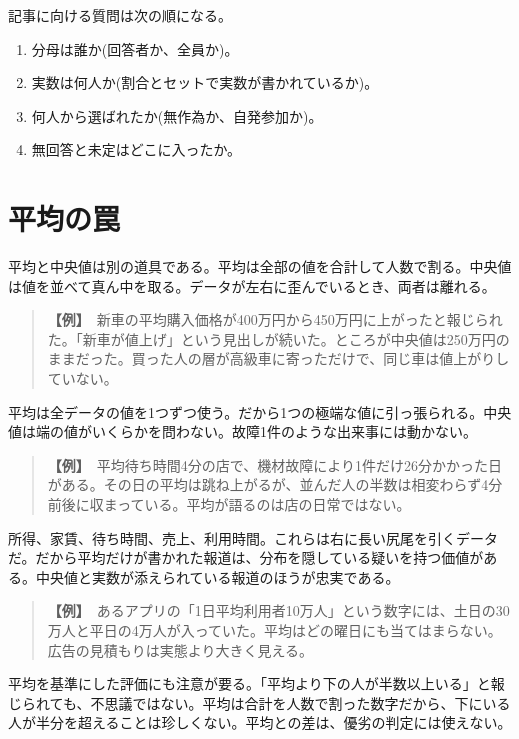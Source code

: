 \documentclass{article}
\begin{document}
記事に向ける質問は次の順になる。

\begin{enumerate}
\item 分母は誰か(回答者か、全員か)。
\item 実数は何人か(割合とセットで実数が書かれているか)。
\item 何人から選ばれたか(無作為か、自発参加か)。
\item 無回答と未定はどこに入ったか。
\end{enumerate}

\section{平均の罠}

平均と中央値は別の道具である。平均は全部の値を合計して人数で割る。中央値は値を並べて真ん中を取る。データが左右に歪んでいるとき、両者は離れる。

\begin{quote}
\textbf{【例】}\ 新車の平均購入価格が400万円から450万円に上がったと報じられた。「新車が値上げ」という見出しが続いた。ところが中央値は250万円のままだった。買った人の層が高級車に寄っただけで、同じ車は値上がりしていない。
\end{quote}

平均は全データの値を1つずつ使う。だから1つの極端な値に引っ張られる。中央値は端の値がいくらかを問わない。故障1件のような出来事には動かない。

\begin{quote}
\textbf{【例】}\ 平均待ち時間4分の店で、機材故障により1件だけ26分かかった日がある。その日の平均は跳ね上がるが、並んだ人の半数は相変わらず4分前後に収まっている。平均が語るのは店の日常ではない。
\end{quote}

所得、家賃、待ち時間、売上、利用時間。これらは右に長い尻尾を引くデータだ。だから平均だけが書かれた報道は、分布を隠している疑いを持つ価値がある。中央値と実数が添えられている報道のほうが忠実である。

\begin{quote}
\textbf{【例】}\ あるアプリの「1日平均利用者10万人」という数字には、土日の30万人と平日の4万人が入っていた。平均はどの曜日にも当てはまらない。広告の見積もりは実態より大きく見える。
\end{quote}

平均を基準にした評価にも注意が要る。「平均より下の人が半数以上いる」と報じられても、不思議ではない。平均は合計を人数で割った数字だから、下にいる人が半分を超えることは珍しくない。平均との差は、優劣の判定には使えない。
\end{document}
